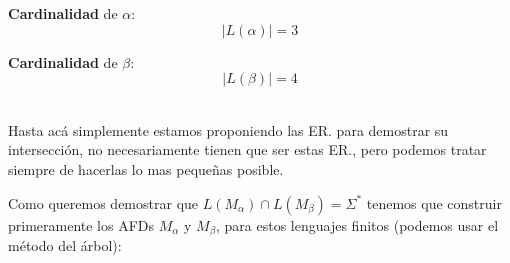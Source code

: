 \begin{minipage}[t]{.5\textwidth}
\raggedright
\textbf{Cardinalidad} de $\alpha$:
$$
|L(\alpha)|=3
$$

\end{minipage}%
\begin{minipage}[t]{.5\textwidth}
\raggedright
\textbf{Cardinalidad} de $\beta$:
$$
|L(\beta)|=4
$$

\end{minipage}
\vspace{0.5cm} \\
Hasta acá simplemente estamos proponiendo las ER. para demostrar su intersección, no necesariamente tienen que ser estas ER., pero podemos tratar siempre de hacerlas lo mas pequeñas posible.

\newpage
Como queremos demostrar que $L(M_\alpha)\cap L(M_\beta)=\Sigma^*$ tenemos que construir primeramente los AFDs $M_\alpha$ y $M_\beta$, para estos lenguajes finitos (podemos usar el método del árbol):


